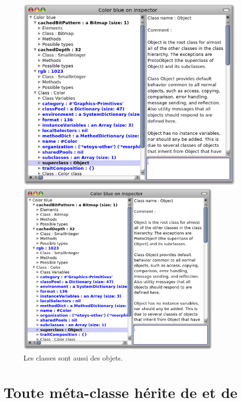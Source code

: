 \documentclass[a4paper,10pt,twoside]{book}
\begin{document}
\begin{center}
\begin{figure}[!ht]
\ifluluelse
	{\centerline{\includegraphics[width=\textwidth]{InspectingColor}}}
	{\centerline{\includegraphics[width=10cm]{InspectingColor}}}
\caption{Les classes sont aussi des objets.}
\end{figure}
\end{center}


\section{Toute m{é}ta-classe h{é}rite de  et de }
\end{document}
